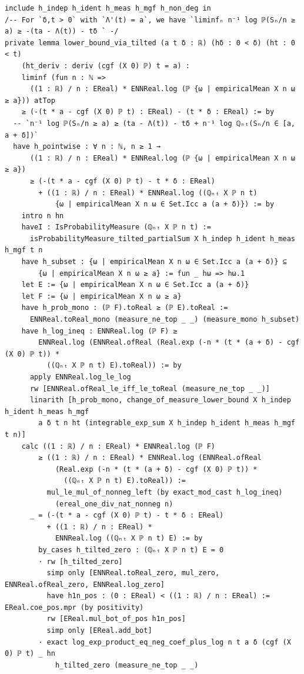 \begin{lstlisting}
include h_indep h_ident h_meas h_mgf h_non_deg in
/-- For `δ,t > 0` with `Λ'(t) = a`, we have `liminfₙ n⁻¹ log ℙ(Sₙ/n ≥ a) ≥ -(ta - Λ(t)) - tδ ` -/
private lemma lower_bound_via_tilted (a t δ : ℝ) (hδ : 0 < δ) (ht : 0 < t)
    (ht_deriv : deriv (cgf (X 0) ℙ) t = a) :
    liminf (fun n : ℕ =>
      ((1 : ℝ) / n : EReal) * ENNReal.log (ℙ {ω | empiricalMean X n ω ≥ a})) atTop
    ≥ (-(t * a - cgf (X 0) ℙ t) : EReal) - (t * δ : EReal) := by
  -- `n⁻¹ log ℙ(Sₙ/n ≥ a) ≥ (ta - Λ(t)) - tδ + n⁻¹ log ℚₙₜ(Sₙ/n ∈ [a, a + δ])`
  have h_pointwise : ∀ n : ℕ, n ≥ 1 →
      ((1 : ℝ) / n : EReal) * ENNReal.log (ℙ {ω | empiricalMean X n ω ≥ a})
      ≥ (-(t * a - cgf (X 0) ℙ t) - t * δ : EReal)
        + ((1 : ℝ) / n : EReal) * ENNReal.log ((ℚₙₜ X ℙ n t)
            {ω | empiricalMean X n ω ∈ Set.Icc a (a + δ)}) := by
    intro n hn
    haveI : IsProbabilityMeasure (ℚₙₜ X ℙ n t) :=
      isProbabilityMeasure_tilted_partialSum X h_indep h_ident h_meas h_mgf t n
    have h_subset : {ω | empiricalMean X n ω ∈ Set.Icc a (a + δ)} ⊆
        {ω | empiricalMean X n ω ≥ a} := fun _ hω => hω.1
    let E := {ω | empiricalMean X n ω ∈ Set.Icc a (a + δ)}
    let F := {ω | empiricalMean X n ω ≥ a}
    have h_prob_mono : (ℙ F).toReal ≥ (ℙ E).toReal :=
      ENNReal.toReal_mono (measure_ne_top _ _) (measure_mono h_subset)
    have h_log_ineq : ENNReal.log (ℙ F) ≥
        ENNReal.log (ENNReal.ofReal (Real.exp (-n * (t * (a + δ) - cgf (X 0) ℙ t)) *
          ((ℚₙₜ X ℙ n t) E).toReal)) := by
      apply ENNReal.log_le_log
      rw [ENNReal.ofReal_le_iff_le_toReal (measure_ne_top _ _)]
      linarith [h_prob_mono, change_of_measure_lower_bound X h_indep h_ident h_meas h_mgf
        a δ t n ht (integrable_exp_sum X h_indep h_ident h_meas h_mgf t n)]
    calc ((1 : ℝ) / n : EReal) * ENNReal.log (ℙ F)
        ≥ ((1 : ℝ) / n : EReal) * ENNReal.log (ENNReal.ofReal
            (Real.exp (-n * (t * (a + δ) - cgf (X 0) ℙ t)) *
              ((ℚₙₜ X ℙ n t) E).toReal)) :=
          mul_le_mul_of_nonneg_left (by exact_mod_cast h_log_ineq)
            (ereal_one_div_nat_nonneg n)
      _ = (-(t * a - cgf (X 0) ℙ t) - t * δ : EReal)
          + ((1 : ℝ) / n : EReal) *
            ENNReal.log ((ℚₙₜ X ℙ n t) E) := by
        by_cases h_tilted_zero : (ℚₙₜ X ℙ n t) E = 0
        · rw [h_tilted_zero]
          simp only [ENNReal.toReal_zero, mul_zero, ENNReal.ofReal_zero, ENNReal.log_zero]
          have h1n_pos : (0 : EReal) < ((1 : ℝ) / n : EReal) := EReal.coe_pos.mpr (by positivity)
          rw [EReal.mul_bot_of_pos h1n_pos]
          simp only [EReal.add_bot]
        · exact log_exp_product_eq_neg_coef_plus_log n t a δ (cgf (X 0) ℙ t) _ hn
            h_tilted_zero (measure_ne_top _ _)
\end{lstlisting}

